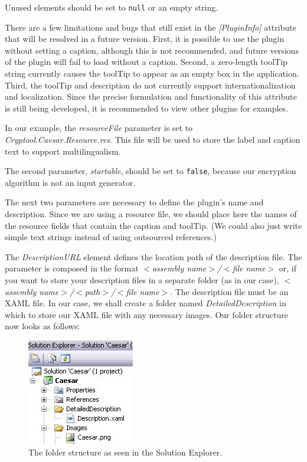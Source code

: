 \noindent Unused elements should be set to \texttt{null} or an empty string.

There are a few limitations and bugs that still exist in the \textit{[PluginInfo]} attribute that will be resolved in a future version. First, it is possible to use the plugin without setting a caption, although this is not recommended, and future versions of the plugin will fail to load without a caption. Second, a zero-length toolTip string currently causes the toolTip to appear as an empty box in the application. Third, the toolTip and description do not currently support internationalization and localization. Since the precise formulation and functionality of this attribute is still being developed, it is recommended to view other plugins for examples.

In our example, the \textit{resourceFile} parameter is set to \textit{Cryptool.Caesar.Resource.res}. This file will be used to store the label and caption text to support multilingualism.

The second parameter, \textit{startable}, should be set to \texttt{false}, because our encryption algorithm is not an input generator.

The next two parameters are necessary to define the plugin's name and description. Since we are using a resource file, we should place here the names of the resource fields that contain the caption and toolTip. (We could also just write simple text strings instead of using outsourced references.)

The \textit{DescriptionURL} element defines the location path of the description file. The parameter is composed in the format \textit{$<$assembly name$>$/$<$file name$>$} or, if you want to store your description files in a separate folder (as in our case), \textit{$<$assembly name$>$/$<$path$>$/$<$file name$>$}. The description file must be an XAML file. In our case, we shall create a folder named \textit{DetailedDescription} in which to store our XAML file with any necessary images. Our folder structure now looks as follows:

\begin{figure}[h!]
	\centering
		\includegraphics[width=.30\textwidth]{figures/detailed_description.jpg}
	\caption{The folder structure as seen in the Solution Explorer.}
	\label{fig:attribute_plugininfo_icon_path}
\end{figure}
\clearpage

